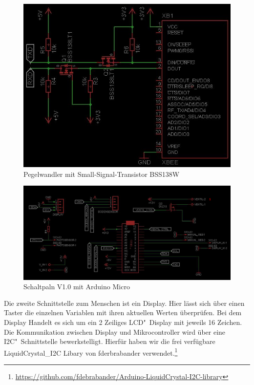 \begin{figure}
	\centering
	\includegraphics[width=0.9\linewidth]{bilder/v1SchaltplanXbee.jpg}
	\caption{Pegelwandler mit Small-Signal-Transistor BSS138W }
	\label{fig-Pegel}
\end{figure}

\begin{figure}[t]
	\centering
	\includegraphics[width=0.85\linewidth]{bilder/v1SchaltplanMicro0.JPG}
	\caption{Schaltpaln V1.0 mit Arduino Micro}
	\label{fig-Schaltplanv1.0}
\end{figure}

		
Die zweite Schnittstelle zum Menschen ist ein Display. 
Hier lässt sich über einen Taster die einzelnen Variablen mit ihren aktuellen Werten überprüfen. 
Bei dem Display Handelt es sich um ein 2 Zeiliges LCD"~Display mit jeweils 16 Zeichen. 
Die Kommunikation zwischen Display und Mikrocontroller wird über eine I2C"~Schnittstelle bewerkstelligt. 
Hierfür haben wir die frei verfügbare \mbox{LiquidCrystal\_I2C} Libary von fderbrabander verwendet.\footnote{\href{https://github.com/fdebrabander/Arduino-LiquidCrystal-I2C-library}{https://github.com/fdebrabander/Arduino-LiquidCrystal-I2C-library}}



